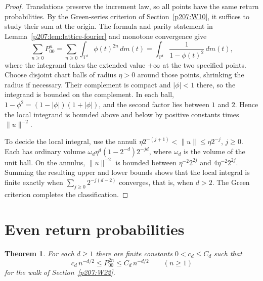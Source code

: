 \documentclass[11pt,oneside,openany]{book}
\theoremstyle{plain}
\newtheorem{theorem}{Theorem}[chapter]
\theoremstyle{definition}
\theoremstyle{remark}
\begin{document}
\begin{proof}
Translations preserve the increment law, so all points have the
same return probabilities. By the Green-series criterion of
Section~\ref{p207:W10}, it suffices to study their sum at the origin.
The formula and parity statement in
Lemma~\ref{p207:lem:lattice-fourier} and monotone convergence give
\[
 \sum_{n\geq 0}P^n_{00}
 =\sum_{n\geq 0}\int_{\mathbb T^d}\phi(t)^{2n}\,dm(t)
 =\int_{\mathbb T^d}\frac{1}{1-\phi(t)^2}\,dm(t),
\]
where the integrand takes the extended value \(+\infty\) at the two
specified points. Choose disjoint chart balls of radius \(\eta>0\)
around those points, shrinking the radius if necessary. Their
complement is compact and \(\lvert\phi\rvert<1\) there, so the
integrand is bounded on the complement. In each ball,
\(1-\phi^2=(1-\lvert\phi\rvert)(1+\lvert\phi\rvert)\), and the second
factor lies between \(1\) and \(2\). Hence the local integrand is
bounded above and below by positive constants times
\(\lVert u\rVert^{-2}\).

To decide the local integral, use the annuli
\(\eta2^{-(j+1)}<\lVert u\rVert\leq \eta2^{-j}\), \(j\geq0\).
Each has ordinary volume
\(\omega_d\eta^d(1-2^{-d})2^{-jd}\), where \(\omega_d\) is the volume of
the unit ball. On the annulus, \(\lVert u\rVert^{-2}\) is bounded
between \(\eta^{-2}2^{2j}\) and \(4\eta^{-2}2^{2j}\). Summing the
resulting upper and lower bounds shows that the local integral is
finite exactly when \(\sum_{j\geq0}2^{-j(d-2)}\) converges, that is,
when \(d>2\). The Green criterion completes the classification.
\end{proof}

\section{Even return probabilities}\label{p207:W23}

\begin{theorem}\label{p207:thm:lattice-return-rate}
For each \(d\geq1\) there are finite constants \(0<c_d\leq C_d\) such
that
\[
 c_d\,n^{-d/2}\leq P^{2n}_{00}\leq C_d\,n^{-d/2}
 \qquad(n\geq1)
\]
for the walk of Section~\ref{p207:W22}.
\end{theorem}
\end{document}
